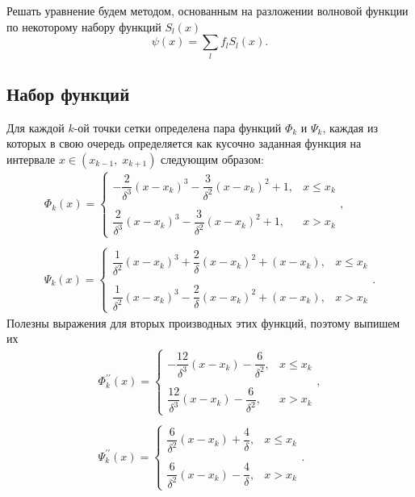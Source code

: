 \documentclass[10pt]{article}
\begin{document}
Решать уравнение будем методом, основанным на разложении волновой функции по некоторому набору функций $S_l(x)$
\begin{equation}
    \psi(x) = \sum\limits_{l} f_l S_l(x).
    \label{eq:decomp}
\end{equation}

\subsection{Набор функций}



Для каждой $k$-ой точки сетки определена пара функций $\Phi_k$ и $\Psi_k$, каждая из которых в свою очередь определяется как кусочно заданная функция на интервале $x\in(x_{k-1},\; x_{k+1})$ следующим образом:
\begin{equation}
    \begin{split}
        \Phi_{k}(x) =
        \begin{cases}
         -\dfrac{2}{\delta^3}(x-x_{k})^3 - \dfrac{3}{\delta^2}(x-x_{k})^2 + 1, & x\le x_k\\
         &\quad\\
         \dfrac{2}{\delta^3}(x-x_{k})^3 - \dfrac{3}{\delta^2}(x-x_{k})^2 + 1, & x>x_k
        \end{cases},\\
        \quad\\
        \Psi_{k}(x) =
        \begin{cases}
         \dfrac{1}{\delta^2}(x-x_{k})^3 + \dfrac{2}{\delta}(x-x_{k})^2 + (x-x_{k}), & x\le x_k\\
         &\quad\\
         \dfrac{1}{\delta^2}(x-x_{k})^3 - \dfrac{2}{\delta}(x-x_{k})^2 + (x-x_{k}), & x>x_k
        \end{cases}.
    \end{split}
\end{equation}
Полезны выражения для вторых производных этих функций, поэтому выпишем их
\begin{equation}
    \begin{split}\Phi_{k}^{\prime\prime}(x) =
        \begin{cases}
         -\dfrac{12}{\delta^3}(x-x_{k}) - \dfrac{6}{\delta^2}, & x\le x_k\\
         &\quad\\
         \dfrac{12}{\delta^3}(x-x_{k}) - \dfrac{6}{\delta^2}, & x>x_k
        \end{cases},\\
        \quad\\
        \Psi_{k}^{\prime\prime}(x) =
        \begin{cases}
         \dfrac{6}{\delta^2}(x-x_{k}) + \dfrac{4}{\delta}, & x\le x_k\\
         &\quad\\
         \dfrac{6}{\delta^2}(x-x_{k}) - \dfrac{4}{\delta}, & x>x_k
        \end{cases}.
    \end{split}
\end{equation}
\end{document}
